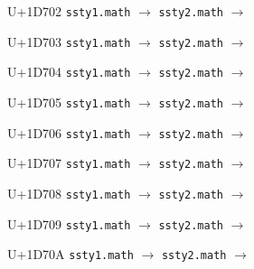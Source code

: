 \documentclass{article}
\begin{document}
\begin{substitutions}
\goodbreak

U+1D702  \linebreak
    \texttt{ssty1.math} $\to$  \linebreak
    \texttt{ssty2.math} $\to$  

\goodbreak

U+1D703  \linebreak
    \texttt{ssty1.math} $\to$  \linebreak
    \texttt{ssty2.math} $\to$  

\goodbreak

U+1D704  \linebreak
    \texttt{ssty1.math} $\to$  \linebreak
    \texttt{ssty2.math} $\to$  

\goodbreak

U+1D705  \linebreak
    \texttt{ssty1.math} $\to$  \linebreak
    \texttt{ssty2.math} $\to$  

\goodbreak

U+1D706  \linebreak
    \texttt{ssty1.math} $\to$  \linebreak
    \texttt{ssty2.math} $\to$  

\goodbreak

U+1D707  \linebreak
    \texttt{ssty1.math} $\to$  \linebreak
    \texttt{ssty2.math} $\to$  

\goodbreak

U+1D708  \linebreak
    \texttt{ssty1.math} $\to$  \linebreak
    \texttt{ssty2.math} $\to$  

\goodbreak

U+1D709  \linebreak
    \texttt{ssty1.math} $\to$  \linebreak
    \texttt{ssty2.math} $\to$  

\goodbreak

U+1D70A  \linebreak
    \texttt{ssty1.math} $\to$  \linebreak
    \texttt{ssty2.math} $\to$  


\end{substitutions}
\end{document}
